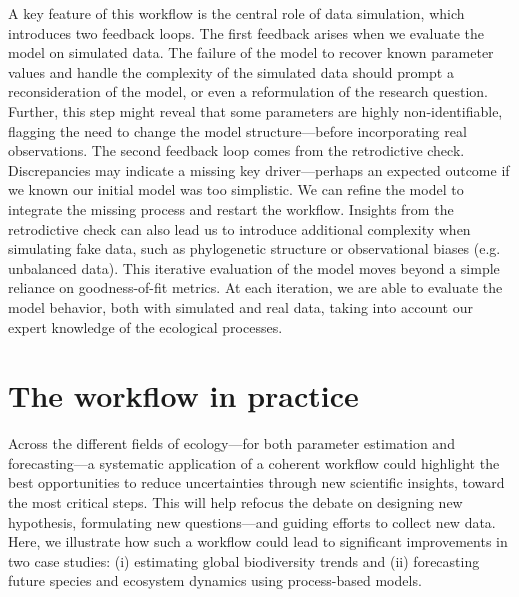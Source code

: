 \documentclass[11pt]{article}
\begin{document}
A key feature of this workflow is the central role of data simulation, which introduces two feedback loops. The first feedback arises when we evaluate the model on simulated data.
The failure of the model to recover known parameter values and handle the complexity of the simulated data should prompt a reconsideration of the model, or even a reformulation of the research question.
Further, %
this step might reveal that some parameters are highly non-identifiable,
flagging %
the need to change the model structure---before incorporating real observations. 
The second feedback loop comes from the retrodictive check. 
Discrepancies may indicate a missing key driver---perhaps an expected outcome if we known our initial model was too simplistic. We can refine the model to integrate the missing process and restart the workflow. Insights from the retrodictive check can also lead us to introduce additional complexity when simulating fake data, such as phylogenetic structure or observational biases (e.g. unbalanced data). This iterative evaluation of the model moves beyond a simple reliance on goodness-of-fit metrics. At each iteration, we are able to evaluate the model behavior, both with simulated and real data, taking into account our expert knowledge of the ecological processes. 

\section{The workflow in practice}

Across the different fields of ecology---for both parameter estimation and forecasting---a systematic application of a coherent workflow could highlight the best opportunities to reduce uncertainties through new scientific insights, toward the most critical steps. This will help refocus the debate on designing new hypothesis, formulating new questions---and guiding efforts to collect new data. Here, we illustrate how such a workflow could lead to significant improvements in two case studies: (i) estimating global biodiversity trends and (ii) forecasting future species and ecosystem dynamics using process-based models.
\end{document}
